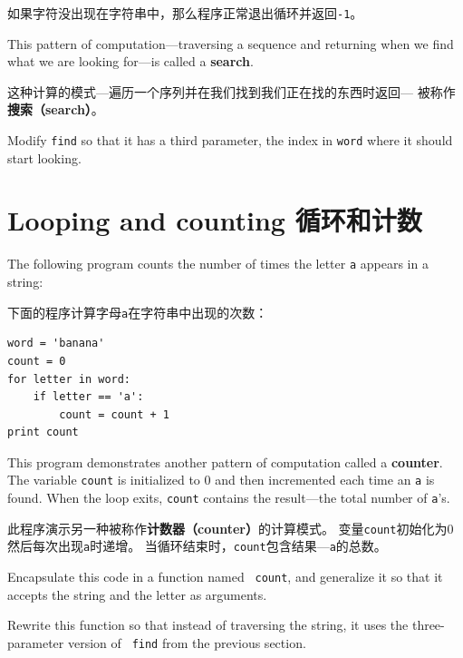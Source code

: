 \documentclass[10pt]{book}
\begin{document}
\begin{CJK}{UTF8}{gbsn}
如果字符没出现在字符串中，那么程序正常退出循环并返回{\tt -1}。

This pattern of computation---traversing a sequence and returning
when we find what we are looking for---is called a {\bf search}.

这种计算的模式---遍历一个序列并在我们找到我们正在找的东西时返回---
被称作{\bf 搜索（search）}。

\begin{exercise}

Modify {\tt find} so that it has a
third parameter, the index in {\tt word} where it should start
looking.

\end{exercise}


\section{Looping and counting 循环和计数}
\label{counter}

The following program counts the number of times the letter {\tt a}
appears in a string:

下面的程序计算字母{\tt a}在字符串中出现的次数：

\begin{verbatim}
word = 'banana'
count = 0
for letter in word:
    if letter == 'a':
        count = count + 1
print count
\end{verbatim}
%
This program demonstrates another pattern of computation called a {\bf
counter}.  The variable {\tt count} is initialized to 0 and then
incremented each time an {\tt a} is found.
When the loop exits, {\tt count}
contains the result---the total number of {\tt a}'s.

此程序演示另一种被称作{\bf 计数器（counter）}的计算模式。
变量{\tt count}初始化为0然后每次出现{\tt a}时递增。
当循环结束时，{\tt count}包含结果---{\tt a}的总数。

\begin{exercise}

Encapsulate this code in a function named {\tt
count}, and generalize it so that it accepts the string and the
letter as arguments.
\end{exercise}

\begin{exercise}

Rewrite this function so that instead of
traversing the string, it uses the three-parameter version of {\tt
find} from the previous section.


\end{exercise}
\end{CJK}
\end{document}
